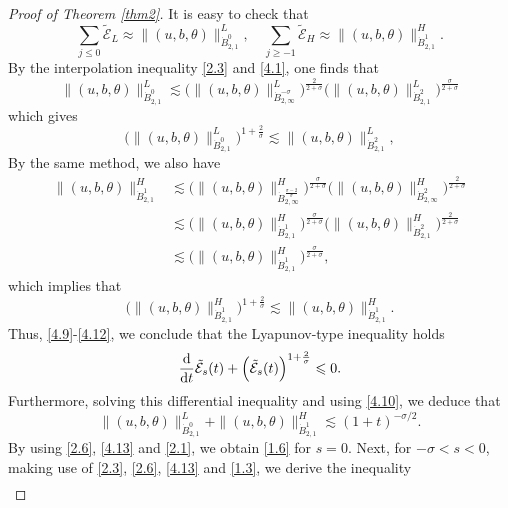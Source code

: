 \documentclass[reqno]{amsart}
\begin{document}
\begin{proof}[Proof of Theorem \ref{thm2}]
 It is easy to check that
\begin{equation}\label{4.10}
 \sum_{j\leqslant 0}\tilde{\mathcal{E}}_L\approx\|(u,b,\theta)\|^L_{\dot{B}^{0}_{2,1}}, 
 \quad 
  \sum_{j\geqslant-1}\tilde{\mathcal{E}}_H\approx\|(u,b,\theta)\|^H_{\dot{B}^{1}_{2,1}}.
\end{equation}
By the interpolation inequality \eqref{2.3} and \eqref{4.1}, one finds that
\[
 \|(u,b,\theta)\|^L_{\dot{B}^{0}_{2,1}}
 \lesssim\Big(\|(u,b,\theta)
 \|^L_{\dot{B}^{-\sigma}_{2,\infty}}\Big)^{\frac{2}{2+\sigma}}
 \Big(\|(u,b,\theta)\|^L_{\dot{B}^{2}_{2,1}}\Big)^{\frac{\sigma}{2+\sigma}}
\]
which gives 
\begin{equation}
 \Big(\|(u,b,\theta)\|^L_{\dot{B}^{0}_{2,1}}\Big)^{1+\frac{2}{\sigma}}
 \lesssim\|(u,b,\theta)\|^L_{\dot{B}^{2}_{2,1}},
\end{equation}
By the same method, we also have
 \begin{align*}
 \|(u,b,\theta)\|^H_{\dot{B}^{1}_{2,1}}
 &\lesssim \Big(\|(u,b,\theta)\|^H_{\dot{B}^{\frac{\sigma-2}{\sigma}}_{2,\infty}}
  \Big)^{\frac{\sigma}{2+\sigma}}
   \Big(\|(u,b,\theta)\|^H_{\dot{B}^{2}_{2,\infty}}\Big)^{\frac{2}{2+\sigma}}\\
 &\lesssim \Big(\|(u,b,\theta)\|^H_{\dot{B}^{1}_{2,1}}\Big)^{\frac{\sigma}{2+\sigma}}
  \Big(\|(u,b,\theta)\|^H_{\dot{B}^{2}_{2,1}}\Big)^{\frac{2}{2+\sigma}}\\
 &\lesssim \Big(\|(u,b,\theta)\|^H_{\dot{B}^{1}_{2,1}}\Big)^{\frac{\sigma}{2+\sigma}},
\end{align*}
which implies that
\begin{equation}\label{4.12}
 \Big(\|(u,b,\theta)\|^H_{\dot{B}^{1}_{2,1}}\Big)^{1+\frac{2}{\sigma}}
 \lesssim\|(u,b,\theta)\|^H_{\dot{B}^{1}_{2,1}}.
\end{equation}
Thus,  \eqref{4.9}-\eqref{4.12}, we conclude that the Lyapunov-type inequality holds
\[
 \frac{\rm d}{{\rm d}t}\tilde{\mathcal{E}}_s(t)
 +\Big(\tilde{\mathcal{E}}_s(t)\Big)^{1+\frac{2}{\sigma}}\leqslant 0.
\]
Furthermore, solving this differential inequality and using \eqref{4.10}, we deduce 
that
\begin{equation}\label{4.13}
 \|(u,b,\theta)\|^L_{\dot{B}^{0}_{2,1}}+\|(u,b,\theta)\|^H_{\dot{B}^{1}_{2,1}}
 \lesssim(1+t)^{-\sigma/2}.
\end{equation}
By using \eqref{2.6}, \eqref{4.13} and \eqref{2.1}, we obtain \eqref{1.6} for $s=0$.
 Next, for $-\sigma<s<0$, making use of \eqref{2.3}, \eqref{2.6}, \eqref{4.13} and 
\eqref{1.3}, we derive the  inequality
 \begin{align*}

\end{align*}
\end{proof}
\end{document}
